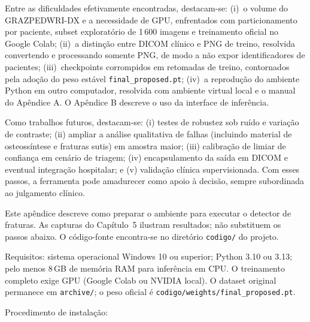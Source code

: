 \documentclass[12pt,oneside,a4paper,chapter=TITLE,section=TITLE,sumario=tradicional]{abntex2}
\begin{document}
Entre as dificuldades efetivamente encontradas, destacam-se: (i)~o volume do GRAZPEDWRI-DX e a necessidade de GPU, enfrentados com particionamento por paciente, subset exploratório de 1\,600 imagens e treinamento oficial no Google Colab; (ii)~a distinção entre DICOM clínico e PNG de treino, resolvida convertendo e processando somente PNG, de modo a não expor identificadores de pacientes; (iii)~checkpoints corrompidos em retomadas de treino, contornados pela adoção do peso estável \texttt{final\_proposed.pt}; (iv)~a reprodução do ambiente Python em outro computador, resolvida com ambiente virtual local e o manual do Apêndice A. O Apêndice B descreve o uso da interface de inferência.

Como trabalhos futuros, destacam-se: (i) testes de robustez sob ruído e variação de contraste; (ii) ampliar a análise qualitativa de falhas (incluindo material de osteossíntese e fraturas sutis) em amostra maior; (iii) calibração de limiar de confiança em cenário de triagem; (iv) encapsulamento da saída em DICOM e eventual integração hospitalar; e (v) validação clínica supervisionada. Com esses passos, a ferramenta pode amadurecer como apoio à decisão, sempre subordinada ao julgamento clínico.

\postextual
\nocite{deeplearningbook2024,litjens2017survey,zuiderveld1994clahe,ibm2024,kim2020,topol2019,dicomstandard2024,lin2014coco,rajpurkar2017,ronneberger2015,smith2021,venturus2024,viso2024,zhou2020,nagy2022grazpedwri,redmon2016you,jocher2023ultralytics}



Este apêndice descreve como preparar o ambiente para executar o detector de fraturas. As capturas do Capítulo~5 ilustram resultados; não substituem os passos abaixo. O código-fonte encontra-se no diretório \texttt{codigo/} do projeto.

Requisitos: sistema operacional Windows 10 ou superior; Python 3.10 ou 3.13; pelo menos 8\,GB de memória RAM para inferência em CPU. O treinamento completo exige GPU (Google Colab ou NVIDIA local). O dataset original permanece em \texttt{archive/}; o peso oficial é \texttt{codigo/weights/final\_proposed.pt}.

Procedimento de instalação:
\end{document}
